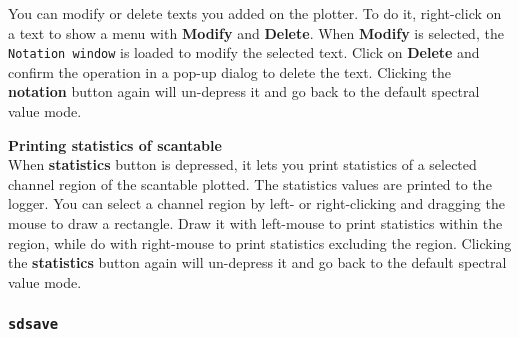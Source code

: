 You can modify or delete texts you added on the plotter. 
To do it, right-click on a text to show a menu with 
{\bf Modify} and {\bf Delete}. 
When {\bf Modify} is selected, the {\tt Notation window} is loaded
to modify the selected text. 
Click on {\bf Delete} and confirm the operation in a pop-up dialog 
to delete the text.
Clicking the {\bf notation} button again will un-depress it and go back 
to the default spectral value mode.


{\bf Printing statistics of scantable}\\
When {\bf statistics} button is depressed, 
it lets you print statistics of a selected channel region 
of the scantable plotted. 
The statistics values are printed to the logger.
You can select a channel region by left- or right-clicking and 
dragging the mouse to draw a rectangle. 
Draw it with left-mouse to print statistics within the region,
while do with right-mouse to print statistics excluding the region.
Clicking the {\bf statistics} button again will un-depress it and go back 
to the default spectral value mode.




\subsubsection{{\tt sdsave}}
\label{section:sd.sdtasks.tasks.sdsave}

